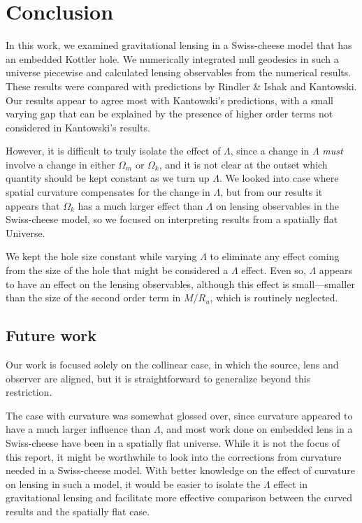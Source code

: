 \chapter{Conclusion}
\label{chapter:conclusion}

In this work, we examined gravitational lensing in a Swiss-cheese model that has an embedded Kottler hole. We numerically integrated null geodesics in such a universe piecewise and calculated lensing observables from the numerical results. These results were compared with predictions by Rindler \& Ishak and Kantowski. Our results appear to agree most with Kantowski's predictions, with a small varying gap that can be explained by the presence of higher order terms not considered in Kantowski's results. 

However, it is difficult to truly isolate the effect of $\Lambda$, since a change in $\Lambda$ \emph{must} involve a change in either $\Omega_m$ or $\Omega_k$, and it is not clear at the outset which quantity should be kept constant as we turn up $\Lambda$. We looked into case where spatial curvature compensates for the change in $\Lambda$, but from our results it appears that $\Omega_k$ has a much larger effect than $\Lambda$ on lensing observables in the Swiss-cheese model, so we focused on interpreting results from a spatially flat Universe. 

We kept the hole size constant while varying $\Lambda$ to eliminate any effect coming from the size of the hole that might be considered a $\Lambda$ effect. Even so, $\Lambda$ appears to have an effect on the lensing observables, although this effect is small---smaller than the size of the second order term in $M/R_u$, which is routinely neglected. 

\section{Future work}

Our work is focused solely on the collinear case, in which the source, lens and observer are aligned, but it is straightforward to generalize beyond this restriction. 

The case with curvature was somewhat glossed over, since curvature appeared to have a much larger influence than $\Lambda$, and most work done on embedded lens in a Swiss-cheese have been in a spatially flat universe. While it is not the focus of this report, it might be worthwhile to look into the corrections from curvature needed in a Swiss-cheese model.  With better knowledge on the effect of curvature on lensing in such a model, it would be easier to isolate the $\Lambda$ effect in gravitational lensing and facilitate more effective comparison between the curved results and the spatially flat case. 

